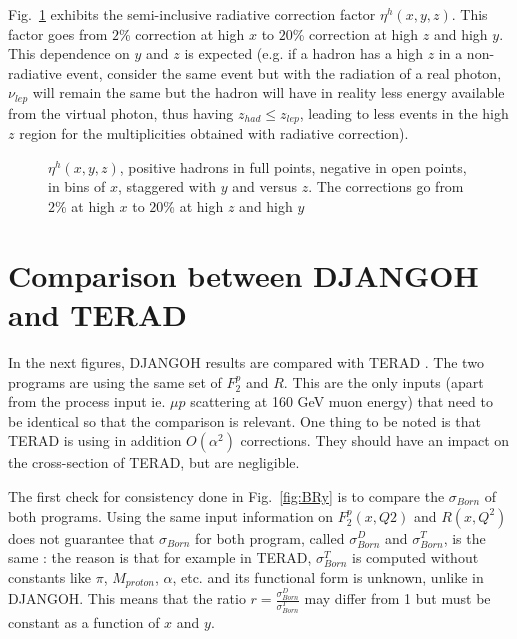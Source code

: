 Fig.~\ref{fig:hadz_ratio} exhibits the semi-inclusive radiative correction factor $\eta^{h}(x,y,z)$. This factor goes from $2$\% correction at high $x$ to $20$\% correction at high $z$ and high $y$. This dependence on $y$ and $z$ is expected (e.g. if a hadron has a high $z$ in a non-radiative event, consider the same event but with the radiation of a real photon, $\nu_{lep}$ will remain the same but the hadron will have in reality less energy available from the virtual photon, thus having $z_{had} \leq z_{lep}$, leading to less events in the high $z$ region for the multiplicities obtained with radiative correction).

\begin{figure}[!htb]
\centerline{}
\caption{$\eta^{h}(x,y,z)$, positive hadrons in full points, negative in open points, in bins of $x$, staggered with $y$ and versus $z$. The corrections go from $2$\% at high $x$ to $20$\% at high $z$ and high $y$}\label{fig:hadz_ratio}
\end{figure}


\section{Comparison between DJANGOH and TERAD}

In the next figures, DJANGOH results are compared with TERAD \cite{TERAD}. The two programs are using the same set of $F^{p}_{2}$ and $R$. This are the only inputs (apart from the process input ie. $\mu p$ scattering at 160 GeV muon energy) that need to be identical so that the comparison is relevant. One thing to be noted is that TERAD is using in addition $O(\alpha^2)$ corrections. They should have an impact on the cross-section of TERAD, but are negligible.

The first check for consistency done in Fig.~\ref{fig:BRy} is to compare the $\sigma_{Born}$ of both programs. Using the same input information on $F^{p}_{2}(x,Q2)$ and $R(x, Q^2)$ does not guarantee that $\sigma_{Born}$ for both program, called $\sigma^{D}_{Born}$ and $\sigma^{T}_{Born}$, is the same : the reason is that for example in TERAD, $\sigma^{T}_{Born}$ is computed without constants like $\pi$, $M_{proton}$, $\alpha$, etc. and its functional form is unknown, unlike in DJANGOH. This means that the ratio $r=\frac{\sigma^{D}_{Born}}{\sigma^{T}_{Born}}$ may differ from 1 but must be constant as a function of $x$ and $y$.

